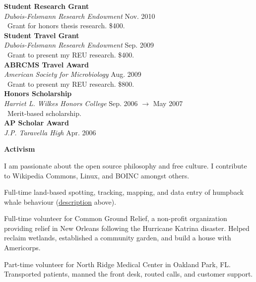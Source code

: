 \documentclass[a4paper,12pt]{article}
\newcommand{\resheading}[1]{{\vspace*{.06in} \colorbox{mygrey}{\begin{minipage}{\textwidth}{\textmd{\large \textbf{#1} \vphantom{p\^{E}}}}\end{minipage}}} }
\newcommand{\ressubheading}[4]{
        \textbf{#1} \hfill #2\\
        \textit{#3} \hfill #4 \\}
\begin{document}
    \ressubheading{Student Research Grant}{}{Dubois-Felsmann Research Endowment}{Nov. 2010}\
    Grant for honors thesis research. \$400.\\
    
    \ressubheading{Student Travel Grant}{}{Dubois-Felsmann Research Endowment}{Sep. 2009}\
    Grant to present my REU research. \$400.\\
    
    \ressubheading{ABRCMS Travel Award}{}{American Society for Microbiology}{Aug. 2009}\
    Grant to present my REU research. \$800.\\
    
    \ressubheading{Honors Scholarship}{}{Harriet L. Wilkes Honors College}{Sep. 2006 $\rightarrow$ May 2007}\
    Merit-based scholarship.\\
    
    \ressubheading{AP Scholar Award}{}{J.P. Taravella High}{Apr. 2006}




\resheading{Activism}
        \begin{description}\setlength{\itemsep}{0mm}
        \item[2006 $\rightarrow$ Present] I am passionate about the open source philosophy and free culture. I contribute to Wikipedia Commons, Linux, and BOINC amongst others.
        \item[2012] Full-time land-based spotting, tracking, mapping, and data entry of humpback whale behaviour (\hyperlink{whalevolunteering}{description} above).
        \item[2008] Full-time volunteer for Common Ground Relief, a non-profit organization providing relief in New Orleans following the Hurricane Katrina disaster. Helped reclaim wetlands, established a community garden, and build a house with Americorps.
        \item[2006 $\rightarrow$ 2007] Part-time volunteer for North Ridge Medical Center in Oakland Park, FL.  Transported patients, manned the front desk, routed calls, and customer support.
        \end{description}
\end{document}
